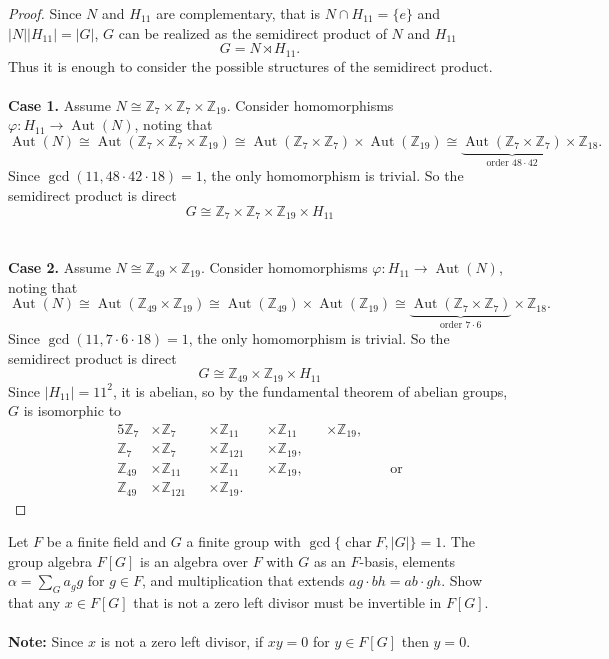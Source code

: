 \documentclass{article}
\newenvironment{problem}[2][Problem]{\begin{trivlist}
\item[\hskip \labelsep {\bfseries #1}\hskip \labelsep {\bfseries #2.}]}{\end{trivlist}}
\newcommand{\Z}{\mathbb Z}
\newcommand{\set}[1]{\{#1\}}
\newcommand{\chr}{\operatorname{char}}
\newcommand{\Aut}{\operatorname{Aut}}
\newcommand{\fn}[3]{{#1 \colon #2 \rightarrow #3}}
\begin{document}
\begin{proof}
  Since $N$ and $H_{11}$ are complementary,
  that is $N \cap H_{11} = \set{e}$ and $|N||H_{11}| = |G|$,
  $G$ can be realized as the semidirect product of $N$ and $H_{11}$ \[
    G = N \rtimes H_{11}.
  \]
  Thus it is enough to consider the possible structures of the semidirect
  product.
  \\~\\
  \textbf{Case 1.} Assume $N \cong \Z_7 \times \Z_7 \times \Z_{19}$.
  Consider homomorphisms $\fn \varphi {H_{11}} {\Aut(N)}$, noting that \[
    \Aut(N)
    \cong \Aut(\Z_7 \times \Z_7 \times \Z_{19})
    \cong \Aut(\Z_7 \times \Z_7) \times \Aut(\Z_{19})
    \cong \underbrace{\Aut(\Z_7 \times \Z_7)}_{\text{order } 48 \cdot 42} \times \Z_{18}.
  \]
  Since $\gcd(11, 48\cdot42\cdot18) = 1$, the only homomorphism is trivial.
  So the semidirect product is direct \[
    G \cong \Z_{7} \times \Z_7 \times \Z_{19} \times H_{11}
  \]
  \\~\\
  \textbf{Case 2.} Assume $N \cong \Z_{49} \times \Z_{19}$.
  Consider homomorphisms $\fn \varphi {H_{11}} {\Aut(N)}$, noting that \[
    \Aut(N)
    \cong \Aut(\Z_{49} \times \Z_{19})
    \cong \Aut(\Z_{49}) \times \Aut(\Z_{19})
    \cong \underbrace{\Aut(\Z_7 \times \Z_7)}_{\text{order } 7 \cdot 6} \times \Z_{18}.
  \]
  Since $\gcd(11, 7\cdot6\cdot18) = 1$, the only homomorphism is trivial.
  So the semidirect product is direct \[
    G \cong \Z_{49} \times \Z_{19} \times H_{11}
  \]
  Since $|H_{11}| = 11^2$, it is abelian, so by the fundamental theorem
  of abelian groups, $G$ is isomorphic to \begin{alignat*}{5}
    \Z_{7} &\times \Z_{7} &&\times \Z_{11} &&\times \Z_{11} &&\times \Z_{19},&& \\
    \Z_{7} &\times \Z_{7} &&\times \Z_{121} &&\times \Z_{19}, && &&\\
    \Z_{49} &\times \Z_{11} &&\times \Z_{11} &&\times \Z_{19},&& && \text{ or}\\
    \Z_{49} &\times \Z_{121} &&\times \Z_{19}.  && && &&
  \end{alignat*}
\end{proof}
\pagebreak

\begin{problem}{3}
  Let $F$ be a finite field and $G$ a finite group with
  $\gcd\set{\chr F, |G|} = 1.$ The group algebra $F[G]$ is an
  algebra over $F$ with $G$ as an $F$-basis, elements $\alpha = \sum_G a_gg$ for
  $g \in F$, and multiplication that extends $ag \cdot bh = ab \cdot gh$.
  Show that any $x \in F[G]$ that is not a zero left divisor must be invertible
  in $F[G]$.
  \\~\\
  \textbf{Note:} Since $x$ is not a zero left divisor, if $xy = 0$ for
  $y \in F[G]$ then $y=0$.
\end{problem}
\end{document}
